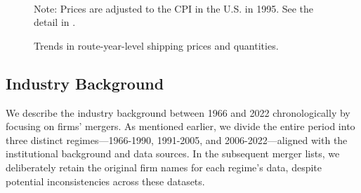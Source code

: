 \documentclass[10pt]{article}
\begin{document}
\begin{figure}[!ht]
\begin{center}
  \\
  \caption{Trends in route-year-level shipping prices and quantities.}
  \label{fg:container_freight_rate_and_shipping_quantity_each_route}
  \end{center}
\footnotesize
  Note: Prices are adjusted to the CPI in the U.S. in 1995. See the detail in \cite{matsuda2022unified}.
\end{figure}

\subsection{Industry Background}\label{sec:industry_background}
We describe the industry background between 1966 and 2022 chronologically by focusing on firms' mergers. 
As mentioned earlier, we divide the entire period into three distinct regimes—1966-1990, 1991-2005, and 2006-2022—aligned with the institutional background and data sources.
In the subsequent merger lists, we deliberately retain the original firm names for each regime's data, despite potential inconsistencies across these datasets.
\end{document}
